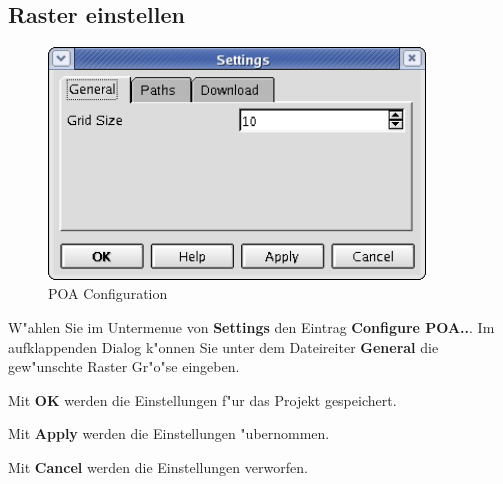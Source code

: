 \documentclass[a4paper,titlepage,12pt,ngerman]{scrbook}
\begin{document}
\subsection{Raster einstellen}
\begin{figure}[htbp]

\begin{center}

\includegraphics[width=10cm]{POAConfiguration1}

\caption{POA Configuration}\label{test}

\end{center}

\end{figure}
W"ahlen Sie im Untermenue von {\bf Settings} den Eintrag {\bf Configure POA..}. Im aufklappenden Dialog k"onnen Sie unter dem Dateireiter {\bf General} die gew"unschte Raster Gr"o"se eingeben.\par
Mit {\bf OK} werden die Einstellungen f"ur das Projekt gespeichert.\par
Mit {\bf Apply} werden die Einstellungen "ubernommen.\par
Mit {\bf Cancel} werden die Einstellungen verworfen.\par 
\end{document}
